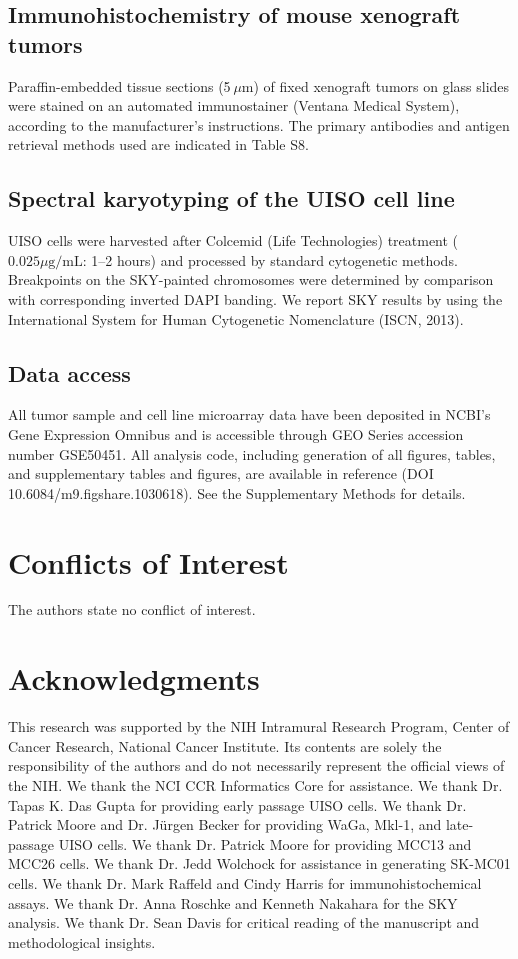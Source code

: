 \documentclass[10pt]{article}
\begin{document}
\subsection*{Immunohistochemistry of mouse xenograft tumors}
Paraffin-embedded tissue sections (5 $\mu\mathrm{m}$) of fixed xenograft tumors on glass slides were stained on an automated immunostainer (Ventana Medical System), according to the manufacturer's instructions.
The primary antibodies and antigen retrieval methods used are indicated in Table S8.

\subsection*{Spectral karyotyping of the UISO cell line}
UISO cells were harvested after Colcemid (Life Technologies) treatment ($0.025 \mu\textrm{g/mL}$: 1–2 hours) and processed by standard cytogenetic methods.
Breakpoints on the SKY-painted chromosomes were determined by comparison with corresponding inverted DAPI banding.
We report SKY results by using the International System for Human Cytogenetic Nomenclature (ISCN, 2013).

\subsection*{Data access}
All tumor sample and cell line microarray data have been deposited in NCBI's Gene Expression Omnibus \citep{Edgar2002Gene} and is accessible through GEO Series accession number GSE50451.
All analysis code, including generation of all figures, tables, and supplementary tables and figures, are available in reference \cite{DailyUISOReproducible2014} (DOI 10.6084/m9.figshare.1030618).
See the Supplementary Methods for details.

\section*{Conflicts of Interest}
The authors state no conflict of interest.

\section*{Acknowledgments}
This research was supported by the NIH Intramural Research Program, Center of Cancer Research, National Cancer Institute.
Its contents are solely the responsibility of the authors and do not necessarily represent the official views of the NIH.
We thank the NCI CCR Informatics Core for assistance.
We thank Dr. Tapas K. Das Gupta for providing early passage UISO cells.
We thank Dr. Patrick Moore and Dr. J\"{u}rgen Becker for providing WaGa, Mkl-1, and late-passage UISO cells.
We thank Dr. Patrick Moore for providing MCC13 and MCC26 cells.
We thank Dr. Jedd Wolchock for assistance in generating SK-MC01 cells.
We thank Dr. Mark Raffeld and Cindy Harris for immunohistochemical assays.
We thank Dr. Anna Roschke and Kenneth Nakahara for the SKY analysis.
We thank Dr. Sean Davis for critical reading of the manuscript and methodological insights.
\end{document}
